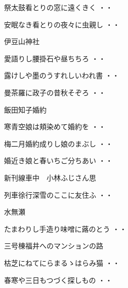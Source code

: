 \begin{shiika}祭太鼓看とりの窓に遠くきく
\hfill{・・}\end{shiika}
\begin{shiika}安眠なき看とりの夜々に虫親し
\hfill{・・}\end{shiika}
\vspace{0.6cm}
伊豆山神社
\begin{shiika}愛語りし腰掛石や昼ちちろ
\hfill{・・}\end{shiika}
\begin{shiika}露けしや墨のうすれしいわれ書
\hfill{・・}\end{shiika}
\begin{shiika}曼茶羅に政子の昔秋そぞろ
\hfill{・・}\end{shiika}
\vspace{0.6cm}
飯田知子婚約
\begin{shiika}寒青空娘は頬染めて婚約を
\hfill{・・}\end{shiika}
\begin{shiika}梅二月婚約成りし娘のまぶし
\hfill{・・}\end{shiika}
\begin{shiika}婚近き娘と春いちご分ちあい
\hfill{・・}\end{shiika}
\vspace{0.6cm}
新刊線車中　小林ふじさん思
\begin{shiika}列車徐行深雪のここに友住ふ
\hfill{・・}\end{shiika}
\vspace{0.6cm}
水無瀬
\begin{shiika}たまわりし手造り味噌に蕗のとう
\hfill{・・}\end{shiika}
\vspace{0.6cm}
三号棟福井へのマンションの路
\begin{shiika}枯芝にねてにらまるゝはらみ猫
\hfill{・・}\end{shiika}
\vspace{0.6cm}
\begin{shiika}春寒や三日もつづく探しもの
\hfill{・・}\end{shiika}
